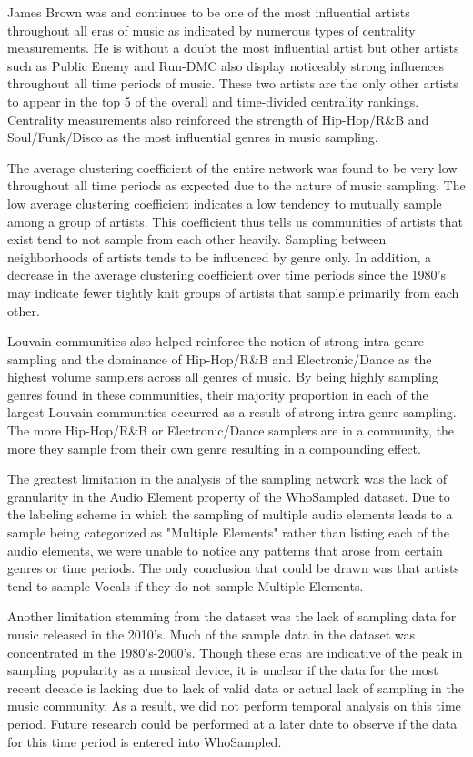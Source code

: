 \documentclass[pageno]{jpaper}
\begin{document}
James Brown was and continues to be one of the most influential artists throughout all eras of music as indicated by numerous types of centrality measurements. He is without a doubt the most influential artist but other artists such as Public Enemy and Run-DMC also display noticeably strong influences throughout all time periods of music. These two artists are the only other artists to appear in the top 5 of the overall and time-divided centrality rankings. Centrality measurements also reinforced the strength of Hip-Hop/R\&B and Soul/Funk/Disco as the most influential genres in music sampling.

The average clustering coefficient of the entire network was found to be very low throughout all time periods as expected due to the nature of music sampling. The low average clustering coefficient indicates a low tendency to mutually sample among a group of artists. This coefficient thus tells us communities of artists that exist tend to not sample from each other heavily. Sampling between neighborhoods of artists tends to be influenced by genre only. In addition, a decrease in the average clustering coefficient over time periods since the 1980's may indicate fewer tightly knit groups of artists that sample primarily from each other.

Louvain communities also helped reinforce the notion of strong intra-genre sampling and the dominance of Hip-Hop/R\&B and Electronic/Dance as the highest volume samplers across all genres of music. By being highly sampling genres found in these communities, their majority proportion in each of the largest Louvain communities occurred as a result of strong intra-genre sampling. The more Hip-Hop/R\&B or Electronic/Dance samplers are in a community, the more they sample from their own genre resulting in a compounding effect.

The greatest limitation in the analysis of the sampling network was the lack of granularity in the Audio Element property of the WhoSampled dataset. Due to the labeling scheme in which the sampling of multiple audio elements leads to a sample being categorized as "Multiple Elements" rather than listing each of the audio elements, we were unable to notice any patterns that arose from certain genres or time periods. The only conclusion that could be drawn was that artists tend to sample Vocals if they do not sample Multiple Elements.

Another limitation stemming from the dataset was the lack of sampling data for music released in the 2010's. Much of the sample data in the dataset was concentrated in the 1980's-2000's. Though these eras are indicative of the peak in sampling popularity as a musical device, it is unclear if the data for the most recent decade is lacking due to lack of valid data or actual lack of sampling in the music community. As a result, we did not perform temporal analysis on this time period. Future research could be performed at a later date to observe if the data for this time period is entered into WhoSampled.
\end{document}
